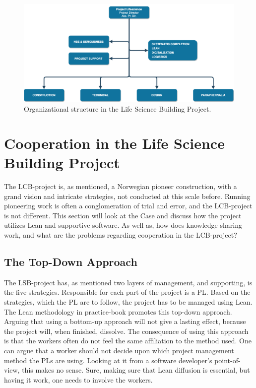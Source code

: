 \begin{figure}
    \centering
    \includegraphics[width=\textwidth]{fig/lvb_diagram.png}
    \caption{Organizational structure in the Life Science Building Project.}
    \label{fig:project_structure}
\end{figure}

\section{Cooperation in the Life Science Building Project}
The LCB-project is, as mentioned, a Norwegian pioneer construction, with a grand vision and intricate strategies, not conducted at this scale before. Running pioneering work is often a conglomeration of trial and error, and the LCB-project is not different. This section will look at the Case and discuss how the project utilizes Lean and supportive software. As well as, how does knowledge sharing work, and what are the problems regarding cooperation in the LCB-project? 

\subsection{The Top-Down Approach}
The LSB-project has, as mentioned two layers of management, and supporting, is the five strategies. Responsible for each part of the project is a PL. Based on the strategies, which the PL are to follow, the project has to be managed using Lean.  The Lean methodology in practice-book \cite{lean_i_praksis} promotes this top-down approach. Arguing that using a bottom-up approach will not give a lasting effect, because the project will, when finished, dissolve. The consequence of using this approach is that the workers often do not feel the same affiliation to the method used. One can argue that a worker should not decide upon which project management method the PLs are using. Looking at it from a software developer's point-of-view, this makes no sense. Sure, making sure that Lean diffusion is essential, but having it work, one needs to involve the workers. 

